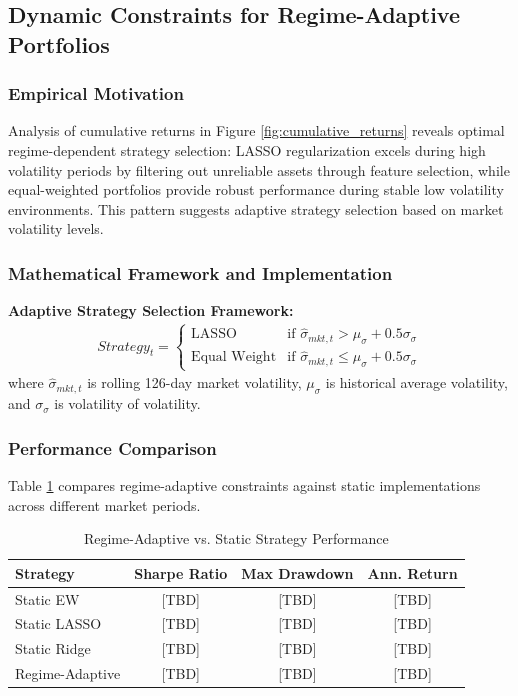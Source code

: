 \documentclass[12pt]{article}
\begin{document}
\subsection{Dynamic Constraints for Regime-Adaptive Portfolios}

\subsubsection{Empirical Motivation}
Analysis of cumulative returns in Figure \ref{fig:cumulative_returns} reveals optimal regime-dependent strategy selection: LASSO regularization excels during high volatility periods by filtering out unreliable assets through feature selection, while equal-weighted portfolios provide robust performance during stable low volatility environments. This pattern suggests adaptive strategy selection based on market volatility levels.

\subsubsection{Mathematical Framework and Implementation}
\textbf{Adaptive Strategy Selection Framework:}
\begin{align}
Strategy_t = \begin{cases}
\text{LASSO} & \text{if } \hat{\sigma}_{mkt,t} > \mu_{\sigma} + 0.5\sigma_{\sigma} \\
\text{Equal Weight} & \text{if } \hat{\sigma}_{mkt,t} \leq \mu_{\sigma} + 0.5\sigma_{\sigma}
\end{cases}
\end{align}
where $\hat{\sigma}_{mkt,t}$ is rolling 126-day market volatility, $\mu_{\sigma}$ is historical average volatility, and $\sigma_{\sigma}$ is volatility of volatility.

\subsubsection{Performance Comparison}
Table \ref{tab:regime_performance} compares regime-adaptive constraints against static implementations across different market periods.

\begin{table}[h]
\centering
\caption{Regime-Adaptive vs. Static Strategy Performance}
\label{tab:regime_performance}
\begin{tabular}{lccc}
\hline
Strategy & Sharpe Ratio & Max Drawdown & Ann. Return \\
\hline
Static EW & [TBD] & [TBD] & [TBD] \\
Static LASSO & [TBD] & [TBD] & [TBD] \\
Static Ridge & [TBD] & [TBD] & [TBD] \\
Regime-Adaptive & [TBD] & [TBD] & [TBD] \\
\hline
\end{tabular}
\end{table}
\end{document}
